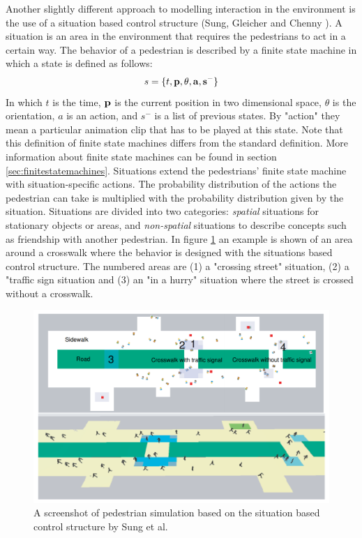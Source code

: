 \documentclass[11pt, a4paper]{book}
\begin{document}
Another slightly different approach to modelling interaction in the environment is the use of a situation based control structure (Sung, Gleicher and Chenny \cite{Sung04scalablebehaviors}). A situation is an area in the environment that requires the pedestrians to act in a certain way. The behavior of a pedestrian is described by a finite state machine in which a state is defined as follows:
 \[s = \{t, \bf{p}, \theta, a, s^- \}\]
In which $t$ is the time, $\bf{p}$ is the current position in two dimensional space, $\theta$ is the orientation, $a$ is an action, and $s^-$ is a list of previous states. By "action" they mean a particular animation clip that has to be played at this state. Note that this definition of finite state machines differs from the standard definition. More information about finite state machines can be found in section \ref{sec:finitestatemachines}.  Situations extend the pedestrians' finite state machine with situation-specific actions. The probability distribution of the actions the pedestrian can take is multiplied with the probability distribution given by the situation. Situations are divided into two categories: \emph{spatial} situations for stationary objects or areas, and \emph{non-spatial} situations to describe concepts such as friendship with another pedestrian. In figure \ref{fig:sungsituations} an example is shown of an area around a crosswalk where the behavior is designed with the situations based control structure. The numbered areas are (1) a "crossing street" situation, (2) a "traffic sign situation and (3) an "in a hurry" situation where the street is crossed without a crosswalk.

\begin{figure}[h!]
\centering
\includegraphics[width=.6\textwidth]{./sung_situations_example.png}
\caption{A screenshot of pedestrian simulation based on the situation based control structure by Sung et al.}
\label{fig:sungsituations}
\end{figure}
\end{document}
